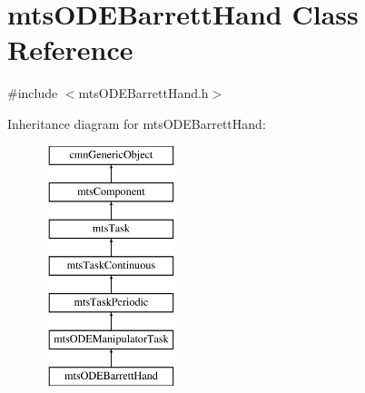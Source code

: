 \hypertarget{classmts_o_d_e_barrett_hand}{}\section{mts\+O\+D\+E\+Barrett\+Hand Class Reference}
\label{classmts_o_d_e_barrett_hand}


{\ttfamily \#include $<$mts\+O\+D\+E\+Barrett\+Hand.\+h$>$}

Inheritance diagram for mts\+O\+D\+E\+Barrett\+Hand\+:\begin{figure}[H]
\begin{center}
\leavevmode
\includegraphics[height=7.000000cm]{d1/da1/classmts_o_d_e_barrett_hand}
\end{center}
\end{figure}
